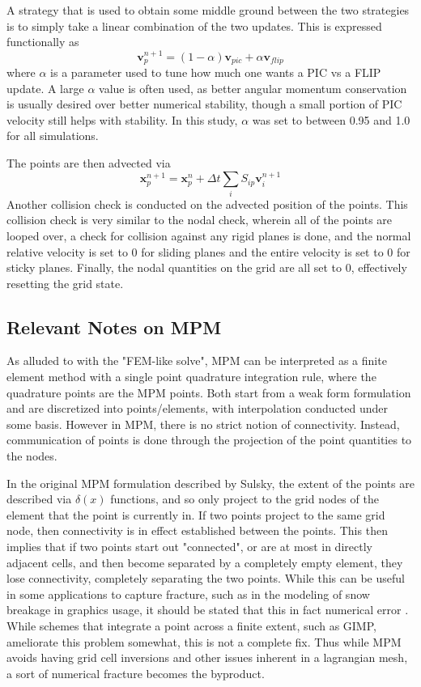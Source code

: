 A strategy that is used to obtain some middle ground between the two strategies is to simply take a linear combination of the two updates. This is expressed functionally as
\begin{equation}
\bm{v}^{n+1}_p=(1-\alpha)\bm{v}_{pic} + \alpha \bm{v}_{flip}
\end{equation}
where $\alpha$ is a parameter used to tune how much one wants a PIC vs a FLIP update. A large $\alpha$ value is often used, as better angular momentum conservation is usually desired over better numerical stability, though a small portion of PIC velocity still helps with stability. In this study, $\alpha$ was set to between 0.95 and 1.0 for all simulations. 

The points are then advected via
\begin{equation}
\bm{x}^{n+1}_p=\bm{x}^n_p+\Delta t\sum_{i}S_{ip}\bm{v}^{n+1}_i
\end{equation}
Another collision check is conducted on the advected position of the points. This collision check is very similar to the nodal check, wherein all of the points are looped over, a check for collision against any rigid planes is done, and the normal relative velocity is set to 0 for sliding planes and the entire velocity is set to 0 for sticky planes. Finally, the nodal quantities on the grid are all set to 0, effectively resetting the grid state.

\subsection{Relevant Notes on MPM}
As alluded to with the "FEM-like solve", MPM can be interpreted as a finite element method with a single point quadrature integration rule, where the quadrature points are the MPM points. Both start from a weak form formulation and are discretized into points/elements, with interpolation conducted under some basis. However in MPM, there is no strict notion of connectivity. Instead, communication of points is done through the projection of the point quantities to the nodes.

In the original MPM formulation described by Sulsky, the extent of the points are described via $\delta(x)$ functions, and so only project to the grid nodes of the element that the point is currently in. If two points project to the same grid node, then connectivity is in effect established between the points. This then implies that if two points start out "connected", or are at most in directly adjacent cells, and then become separated by a completely empty element, they lose connectivity, completely separating the two points. While this can be useful in some applications to capture fracture, such as in the modeling of snow breakage in graphics usage, it should be stated that this in fact numerical error \cite{Stomakhin:2013:MPM}. While schemes that integrate a point across a finite extent, such as GIMP, ameliorate this problem somewhat, this is not a complete fix. Thus while MPM avoids having grid cell inversions and other issues inherent in a lagrangian mesh, a sort of numerical fracture becomes the byproduct.

